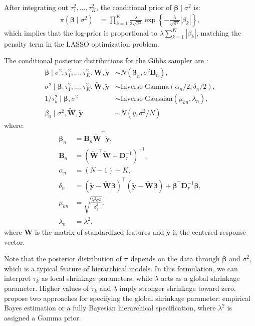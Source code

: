 After integrating out \( \tau_1^2, \dots, \tau_K^2 \), the conditional prior of \( \boldsymbol{\beta} \mid \sigma^2 \) is:
\begin{align*}
	\pi(\boldsymbol{\beta} \mid \sigma^2) &= \prod_{k=1}^K \frac{\lambda}{2 \sqrt{\sigma^2}} \exp\left\{ -\frac{\lambda}{\sqrt{\sigma^2}} |\beta_k| \right\},
\end{align*}
which implies that the log-prior is proportional to \( \lambda \sum_{k=1}^K |\beta_k| \), matching the penalty term in the LASSO optimization problem.

The conditional posterior distributions for the Gibbs sampler are \cite{Park2008}:
\begin{align*}
	\boldsymbol{\beta} \mid \sigma^2, \tau_1^2, \dots, \tau_K^2, \tilde{\mathbf{W}}, \tilde{\mathbf{y}} &\sim {N}(\boldsymbol{\beta}_n, \sigma^2 \mathbf{B}_n), \\
	\sigma^2 \mid \boldsymbol{\beta}, \tau_1^2, \dots, \tau_K^2, \tilde{\mathbf{W}}, \tilde{\mathbf{y}} &\sim \text{Inverse-Gamma}(\alpha_n/2, \delta_n/2), \\
	1/\tau_k^2 \mid \boldsymbol{\beta}, \sigma^2 &\sim \text{Inverse-Gaussian}(\mu_{kn}, \lambda_n),\\
	\beta_0\mid \sigma^2, \tilde{\mathbf{W}}, \tilde{\mathbf{y}} &\sim N(\bar{y},\sigma^2/N) 
\end{align*}
where:
\begin{align*}
	\boldsymbol{\beta}_n &= \mathbf{B}_n \tilde{\mathbf{W}}^{\top} \tilde{\mathbf{y}}, \\
	\mathbf{B}_n &= \left( \tilde{\mathbf{W}}^{\top} \tilde{\mathbf{W}} + \mathbf{D}_{\tau}^{-1} \right)^{-1}, \\
	\alpha_n &= (N - 1) + K, \\
	\delta_n &= (\tilde{\mathbf{y}} - \tilde{\mathbf{W}} \boldsymbol{\beta})^{\top} (\tilde{\mathbf{y}} - \tilde{\mathbf{W}} \boldsymbol{\beta}) + \boldsymbol{\beta}^{\top} \mathbf{D}_{\tau}^{-1} \boldsymbol{\beta}, \\
	\mu_{kn} &= \sqrt{ \frac{ \lambda^2 \sigma^2 }{ \beta_k^2 } }, \\
	\lambda_n &= \lambda^2,
\end{align*}
where $\tilde{\mathbf{W}}$ is the matrix of standardized features and $\tilde{\mathbf{y}}$ is the centered response vector.

Note that the posterior distribution of $\boldsymbol{\tau}$ depends on the data through $\boldsymbol{\beta}$ and $\sigma^2$, which is a typical feature of hierarchical models. In this formulation, we can interpret \( \tau_k \) as local shrinkage parameters, while \( \lambda \) acts as a global shrinkage parameter. Higher values of \( \tau_k \) and \( \lambda \) imply stronger shrinkage toward zero. \cite{Park2008} propose two approaches for specifying the global shrinkage parameter: empirical Bayes estimation or a fully Bayesian hierarchical specification, where \( \lambda^2 \) is assigned a Gamma prior.

